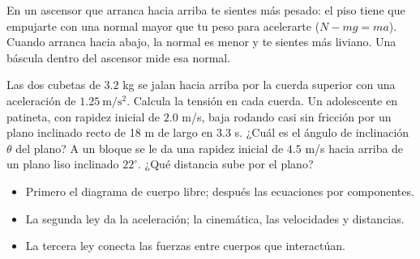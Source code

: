 \documentclass[11pt]{article}
\begin{document}
\begin{aplicacion}[El ascensor]
En un ascensor que arranca hacia arriba te sientes más pesado: el piso tiene que empujarte con
una normal mayor que tu peso para acelerarte ($N - mg = ma$). Cuando arranca hacia abajo, la
normal es menor y te sientes más liviano. Una báscula dentro del ascensor mide esa normal.
\end{aplicacion}

\begin{preguntas}
\pregunta Las dos cubetas de $\num{3,2}$ kg se jalan hacia arriba por la cuerda superior con una
aceleración de $\num{1,25}\ \mathrm{m/s^2}$. Calcula la tensión en cada cuerda.
\espacio{3cm}
\pregunta Un adolescente en patineta, con rapidez inicial de $\num{2,0}$ m/s, baja rodando casi
sin fricción por un plano inclinado recto de 18 m de largo en $\num{3,3}$ s. ¿Cuál es el
ángulo de inclinación $\theta$ del plano?
\espacio{3.5cm}
\pregunta A un bloque se le da una rapidez inicial de $\num{4,5}$ m/s hacia arriba de un plano
liso inclinado $22^\circ$. ¿Qué distancia sube por el plano?
\espacio{3cm}
\end{preguntas}

\begin{resumen}
\begin{itemize}
  \item Primero el diagrama de cuerpo libre; después las ecuaciones por componentes.
  \item La segunda ley da la aceleración; la cinemática, las velocidades y distancias.
  \item La tercera ley conecta las fuerzas entre cuerpos que interactúan.
\end{itemize}
\end{resumen}

\end{document}
